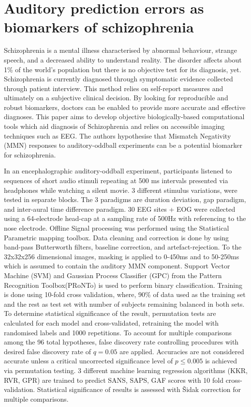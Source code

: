 \documentclass[10pt]{article}
\begin{document}
  \section*{Auditory prediction errors as biomarkers of schizophrenia}
  
  Schizophrenia is a mental illness characterised by abnormal behaviour, strange speech, and a decreased ability to understand reality. The disorder affects about 1\% of the world’s population but there is no objective test for its diagnosis, yet. Schizophrenia is currently diagnosed through symptomatic evidence collected through patient interview. This method relies on self-report measures and ultimately on a subjective clinical decision. By looking for reproducible and robust biomarkers, doctors can be enabled to provide more accurate and effective diagnoses.
  This paper aims to develop objective biologically-based computational tools which aid diagnosis of Schizophrenia and relies on accessible imaging techniques such as EEG.
  The authors hypothesise that Mismatch Negativity (MMN) responses to auditory-oddball experiments can be a potential biomarker for schizophrenia.

  In an encephalographic auditory-oddball experiment, participants listened to sequences of short audio stimuli repeating at 500 ms intervals presented via headphones while watching a silent movie.
  3 different stimulus variations, were tested in separate blocks. 
  The 3 paradigms are duration deviation, gap paradigm, and inter-aural time difference paradigm.
  30 EEG sites + EOG were collected using a 64-electrode head-cap at a sampling rate of 500Hz with referencing to the nose electrode. Offline Signal processing was performed using the Statistical Parametric mapping toolbox.
  Data cleaning and correction is done by using band-pass Butterworth filters, baseline correction, and artefact-rejection. To the 32x32x256 dimensional images, masking is applied to 0-450ms and to 50-250ms which is assumed to contain the auditory MMN component.
  Support Vector Machine (SVM) and Gaussian Process Classifier (GPC) from the Pattern Recognition Toolbox(PRoNTo) is used to perform binary classification. Training is done using 10-fold cross validation, where, 90\% of data used as the training set and the rest as test set with number of subjects remaining balanced in both sets.
  To determine statistical significance of the result, permutation tests are calculated for each model and cross-validated, retraining the model with randomised labels and 1000 repetitions.
  To account for multiple comparisons among the 96 total hypotheses, false discovery rate controlling procedures with desired false discovery rate of $q=0.05$ are applied. 
  Accuracies are not considered accurate unless a critical uncorrected significance level of $p \le 0.005$ is achieved via permutation testing. 3 different machine learning regression algorithms (KKR, RVR, GPR) are trained to predict SANS, SAPS, GAF scores with 10 fold cross-validation. Statistical significance of results is assessed with Šidak correction for multiple comparisons.
\end{document}
